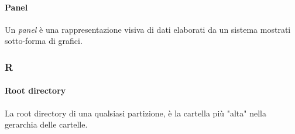 	\paragraph{Panel} \Spazio
	\label{sec:panel}
Un \emph{panel} è una rappresentazione visiva di dati elaborati da un sistema mostrati sotto-forma di grafici.


\subsubsection{R}

	\paragraph{Root directory} \Spazio
	\label{sec:rootdirectory}
La root directory di una qualsiasi partizione, è la cartella più "alta" nella gerarchia delle cartelle.




